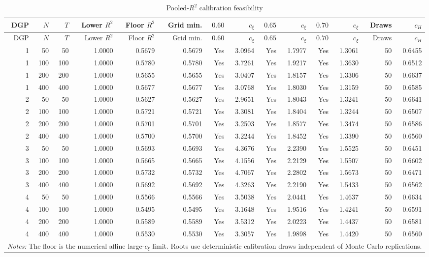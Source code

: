 \begingroup
\small
\begin{longtable}{rrrrrrrrrrrrrr}
\caption{Pooled-$R^2$ calibration feasibility}\label{tab:mc-r2-feasibility}\\
\toprule
DGP & $N$ & $T$ & Lower $R^2$ & Floor $R^2$ & Grid min. & $0.60$ & $c_\xi$ & $0.65$ & $c_\xi$ & $0.70$ & $c_\xi$ & Draws & $c_H$ \\
\midrule
\endfirsthead
\toprule
DGP & $N$ & $T$ & Lower $R^2$ & Floor $R^2$ & Grid min. & $0.60$ & $c_\xi$ & $0.65$ & $c_\xi$ & $0.70$ & $c_\xi$ & Draws & $c_H$ \\
\midrule
\endhead
1 & 50 & 50 & 1.0000 & 0.5679 & 0.5679 & Yes & 3.0964 & Yes & 1.7977 & Yes & 1.3061 & 50 & 0.6455 \\
1 & 100 & 100 & 1.0000 & 0.5780 & 0.5780 & Yes & 3.7261 & Yes & 1.9217 & Yes & 1.3630 & 50 & 0.6512 \\
1 & 200 & 200 & 1.0000 & 0.5655 & 0.5655 & Yes & 3.0407 & Yes & 1.8157 & Yes & 1.3306 & 50 & 0.6637 \\
1 & 400 & 400 & 1.0000 & 0.5677 & 0.5677 & Yes & 3.0768 & Yes & 1.8030 & Yes & 1.3159 & 50 & 0.6585 \\
2 & 50 & 50 & 1.0000 & 0.5627 & 0.5627 & Yes & 2.9651 & Yes & 1.8043 & Yes & 1.3241 & 50 & 0.6641 \\
2 & 100 & 100 & 1.0000 & 0.5721 & 0.5721 & Yes & 3.3081 & Yes & 1.8404 & Yes & 1.3244 & 50 & 0.6507 \\
2 & 200 & 200 & 1.0000 & 0.5701 & 0.5701 & Yes & 3.2503 & Yes & 1.8577 & Yes & 1.3474 & 50 & 0.6586 \\
2 & 400 & 400 & 1.0000 & 0.5700 & 0.5700 & Yes & 3.2244 & Yes & 1.8452 & Yes & 1.3390 & 50 & 0.6560 \\
3 & 50 & 50 & 1.0000 & 0.5693 & 0.5693 & Yes & 4.3676 & Yes & 2.2390 & Yes & 1.5525 & 50 & 0.6451 \\
3 & 100 & 100 & 1.0000 & 0.5665 & 0.5665 & Yes & 4.1556 & Yes & 2.2129 & Yes & 1.5507 & 50 & 0.6602 \\
3 & 200 & 200 & 1.0000 & 0.5732 & 0.5732 & Yes & 4.7067 & Yes & 2.2802 & Yes & 1.5673 & 50 & 0.6471 \\
3 & 400 & 400 & 1.0000 & 0.5692 & 0.5692 & Yes & 4.3263 & Yes & 2.2190 & Yes & 1.5433 & 50 & 0.6562 \\
4 & 50 & 50 & 1.0000 & 0.5566 & 0.5566 & Yes & 3.5038 & Yes & 2.0441 & Yes & 1.4637 & 50 & 0.6634 \\
4 & 100 & 100 & 1.0000 & 0.5495 & 0.5495 & Yes & 3.1648 & Yes & 1.9516 & Yes & 1.4241 & 50 & 0.6591 \\
4 & 200 & 200 & 1.0000 & 0.5589 & 0.5589 & Yes & 3.5312 & Yes & 2.0223 & Yes & 1.4437 & 50 & 0.6581 \\
4 & 400 & 400 & 1.0000 & 0.5530 & 0.5530 & Yes & 3.3057 & Yes & 1.9898 & Yes & 1.4420 & 50 & 0.6560 \\
\bottomrule
\multicolumn{14}{p{0.96\linewidth}}{\footnotesize \textit{Notes:} The floor is the numerical affine large-$c_\xi$ limit. Roots use deterministic calibration draws independent of Monte Carlo replications.} \\
\end{longtable}
\endgroup

